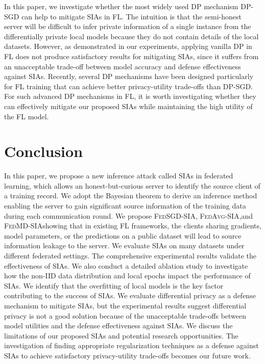 \documentclass[10pt,journal,compsoc]{IEEEtran}
\newcommand*\fedavg{\textsc{FedAvg-SIA}}
\newcommand*\fedsgd{\textsc{FedSGD-SIA}}
\newcommand*\fedmd{\textsc{FedMD-SIA}}
\begin{document}
{In this paper, we investigate whether the most widely used DP mechanism DP-SGD \cite{abadi2016deep} can help to mitigate SIAs in FL. The intuition is that the semi-honest server will be difficult to infer private information of a single instance from the differentially private local models because they do not contain details of the local datasets. However, as demonstrated in our experiments, applying vanilla DP in FL does not produce satisfactory results for mitigating SIAs, since it suffers from an unacceptable trade-off between model accuracy and defense effectiveness against SIAs. Recently, several DP mechanisms \cite{yuan2022membership,wei2021user,zheng2022balancing} have been designed particularly for FL training that can achieve better privacy-utility trade-offs than DP-SGD. For such advanced DP mechanisms in FL, it is worth investigating whether they can effectively mitigate our proposed SIAs while maintaining the high utility of the FL model.}



\section{Conclusion}\label{sec::07}
In this paper, we propose a new inference attack called SIAs in federated learning, which allows an honest-but-curious server to identify the source client of a training record. We adopt the Bayesian theorem to derive an inference method enabling the server to gain significant source information of the training data during each communication round. We propose \fedsgd, \fedavg,\;and \fedmd\;showing that in existing FL frameworks, the clients sharing gradients, model parameters, or the predictions on a public dataset will lead to source information leakage to the server. We evaluate SIAs on many datasets under different federated settings. The comprehensive experimental results validate the effectiveness of SIAs. We also conduct a detailed ablation study to investigate how the non-IID data distribution and local epochs impact the performance of SIAs. We identify that the overfitting of local models is the key factor contributing to the success of SIAs. We evaluate differential privacy as a defense mechanism to mitigate SIAs, but the experimental results suggest differential privacy is not a good solution because of the unacceptable trade-offs between model utilities and the defense effectiveness against SIAs. We discuss the limitations of our proposed SIAs and potential research opportunities. The investigation of finding appropriate regularization techniques as a
defense against SIAs to achieve satisfactory privacy-utility trade-offs becomes our future work.
\end{document}
